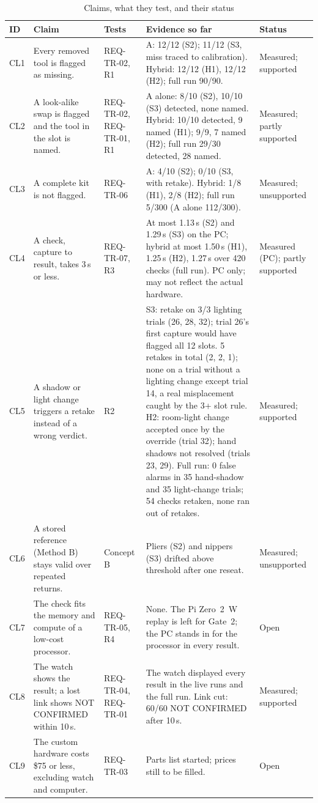 \begin{table}[!t]
\centering
\footnotesize
\caption{Claims, what they test, and their status}
\label{tab:claims}
\begin{tabularx}{\textwidth}{@{}l Y l Y l@{}}
\toprule
ID & Claim & Tests & Evidence so far & Status \\
\midrule
CL1 & Every removed tool is flagged as missing. & REQ-TR-02, R1 & A: 12/12 (S2); 11/12 (S3, miss traced to calibration). Hybrid: 12/12 (H1), 12/12 (H2); full run 90/90. & Measured; supported \\
CL2 & A look-alike swap is flagged and the tool in the slot is named. & REQ-TR-02, REQ-TR-01, R1 & A alone: 8/10 (S2), 10/10 (S3) detected, none named. Hybrid: 10/10 detected, 9 named (H1); 9/9, 7 named (H2); full run 29/30 detected, 28 named. & Measured; partly supported \\
CL3 & A complete kit is not flagged. & REQ-TR-06 & A: 4/10 (S2); 0/10 (S3, with retake). Hybrid: 1/8 (H1), 2/8 (H2); full run 5/300 (A alone 112/300). & Measured; unsupported \\
CL4 & A check, capture to result, takes 3\,s or less. & REQ-TR-07, R3 & At most 1.13\,s (S2) and 1.29\,s (S3) on the PC; hybrid at most 1.50\,s (H1), 1.25\,s (H2), 1.27\,s over 420 checks (full run). PC only; may not reflect the actual hardware. & Measured (PC); partly supported \\
CL5 & A shadow or light change triggers a retake instead of a wrong verdict. & R2 & S3: retake on 3/3 lighting trials (26, 28, 32); trial 26's first capture would have flagged all 12 slots. 5 retakes in total (2, 2, 1); none on a trial without a lighting change except trial 14, a real misplacement caught by the 3+ slot rule. H2: room-light change accepted once by the override (trial 32); hand shadows not resolved (trials 23, 29). Full run: 0 false alarms in 35 hand-shadow and 35 light-change trials; 54 checks retaken, none ran out of retakes. & Measured; supported \\
CL6 & A stored reference (Method B) stays valid over repeated returns. & Concept B & Pliers (S2) and nippers (S3) drifted above threshold after one reseat. & Measured; unsupported \\
CL7 & The check fits the memory and compute of a low-cost processor. & REQ-TR-05, R4 & None. The Pi Zero~2~W replay is left for Gate~2; the PC stands in for the processor in every result. & Open \\
CL8 & The watch shows the result; a lost link shows NOT CONFIRMED within 10\,s. & REQ-TR-04, REQ-TR-01 & The watch displayed every result in the live runs and the full run. Link cut: 60/60 NOT CONFIRMED after 10\,s. & Measured; supported \\
CL9 & The custom hardware costs \$75 or less, excluding watch and computer. & REQ-TR-03 & Parts list started; prices still to be filled. & Open \\
\bottomrule
\end{tabularx}
\end{table}

